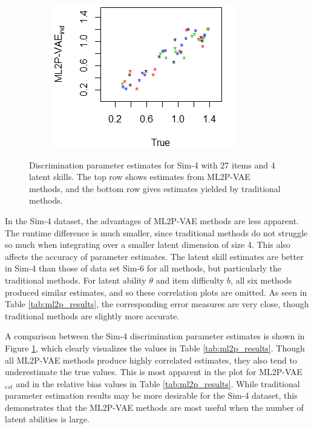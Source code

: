 \begin{figure}[h]
\begin{subfigure}{.32\textwidth}
    \end{subfigure}
    \begin{subfigure}{.32\textwidth}
      \centering
      \includegraphics[width=.9\linewidth]{img/ml_journal_results/4skills/vae_ind_disc_4skills_cropped.png}
    \end{subfigure}
    \caption{Discrimination parameter estimates for Sim-4 with 27 items and 4 latent skills. The top row shows estimates from ML2P-VAE methods, and the bottom row gives estimates yielded by traditional methods.}
    \label{fig:4skills_disc}
\end{figure}

In the Sim-4 dataset, the advantages of ML2P-VAE methods are less apparent. The runtime difference is much smaller, since traditional methods do not struggle so much when integrating over a smaller latent dimension of size 4. This also affects the accuracy of parameter estimates. The latent skill estimates are better in Sim-4 than those of data set Sim-6 for all methods, but particularly the traditional methods. For latent ability $\theta$ and item difficulty $b$, all six methods produced similar estimates, and so these correlation plots are omitted. As seen in Table \ref{tab:ml2p_results}, the corresponding error measures are very close, though traditional methods are slightly more accurate.

A comparison between the Sim-4 discrimination parameter estimates is shown in Figure \ref{fig:4skills_disc}, which clearly visualizes the values in Table \ref{tab:ml2p_results}. Though all ML2P-VAE methods produce highly correlated estimates, they also tend to underestimate the true values. This is most apparent in the plot for ML2P-VAE$_{est}$ and in the relative bias values in Table \ref{tab:ml2p_results}. While traditional parameter estimation results may be more desirable for the Sim-4 dataset, this demonstrates that the ML2P-VAE methods are most useful when the number of latent abilities is large.

